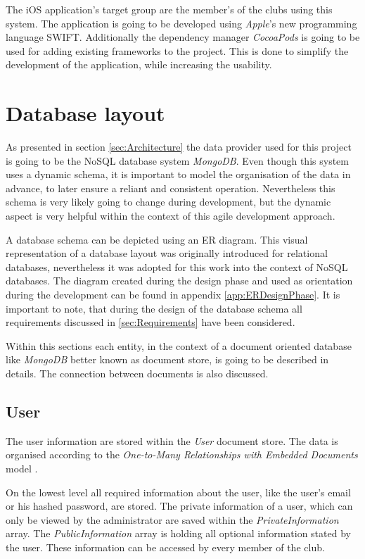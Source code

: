The iOS application's target group are the member's of the clubs using this system. The application is going to be developed using \emph{Apple}'s new programming language \gls{SWIFT}. Additionally the dependency manager \emph{CocoaPods} is going to be used for adding existing frameworks to the project. This is done to simplify the development of the application, while increasing the usability.

\section{Database layout}

As presented in section \vref{sec:Architecture} the data provider used for this project is going to be the \gls{NoSQL} database system \emph{MongoDB}. Even though this system uses a dynamic schema, it is important to model the organisation of the data in advance, to later ensure a reliant and consistent operation. Nevertheless this schema is very likely going to change during development, but the dynamic aspect is very helpful within the context of this agile development approach.

A database schema can be depicted using an \gls{ER} diagram. This visual representation of a database layout was originally introduced for relational databases, nevertheless it was adopted for this work into the context of \gls{NoSQL} databases. The diagram created during the design phase and used as orientation during the development can be found in appendix \vref{app:ERDesignPhase}. It is important to note, that during the design of the database schema all requirements discussed in \vref{sec:Requirements} have been considered.

Within this sections each entity, in the context of a document oriented database like \emph{MongoDB} better known as document store, is going to be described in details. The connection between documents is also discussed.

\subsection{User}
The user information are stored within the \emph{User} document store. The data is organised according to the \emph{One-to-Many Relationships with Embedded Documents} model \cite[p. 141]{Mongo:2014aa}.

On the lowest level all required information about the user, like the user's email or his hashed password, are stored. The private information of a user, which can only be viewed by the administrator are saved within the \emph{PrivateInformation} array. The \emph{PublicInformation} array is holding all optional information stated by the user. These information can be accessed by every member of the club.

